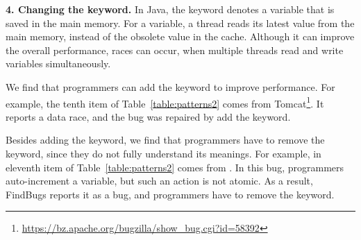 










\noindent
\textbf{4. Changing the  keyword.} In Java, the  keyword denotes a variable that is saved in the main memory. For a  variable, a thread reads its latest value from the main memory, instead of the obsolete  value in the cache. Although it can improve the overall performance, races can occur, when multiple threads read and write  variables simultaneously.

We find that programmers can add the  keyword to improve performance. For example, the tenth item of Table~\ref{table:patterns2} comes from Tomcat\footnote{\url{https://bz.apache.org/bugzilla/show_bug.cgi?id=58392}}. It reports a data race, and the bug was repaired by add the  keyword.


Besides adding the keyword, we find that programmers have to remove the  keyword, since they do not fully understand its meanings. For example, in eleventh item of Table~\ref{table:patterns2} comes from . In this bug, programmers auto-increment a  variable, but such an action is not atomic. As a result, FindBugs reports it as a bug, and programmers have to remove the keyword.

